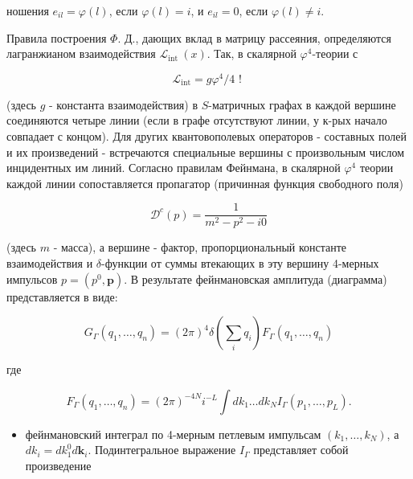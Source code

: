 \documentclass[10pt]{article}
\begin{document}
ношения $e_{i l}=\varphi(l)$, если $\varphi(l)=i$, и $e_{i l}=0$, если $\varphi(l) \neq i$.



Правила построения $\Phi$. Д., дающих вклад в матрицу рассеяния, определяются лагранжианом взаимодействия $\mathscr{L}_{\text {int }}(x)$. Так, в скалярной $\varphi^{4}$-теории с



\[

\mathscr{L}_{\mathrm{int}}=g \varphi^{4} / 4 \text { ! }

\]



(здесь $g$ - константа взаимодействия) в $S$-матричных графах в каждой вершине соединяются четыре линии (если в графе отсутствуют линии, у к-рых начало совпадает с концом). Для других квантовополевых операторов - составных полей и их произведений - встречаются специальные вершины с произвольным числом инцидентных им линий. Согласно правилам Фейнмана, в скалярной $\varphi^{4}$ теории каждой линии сопоставляется пропагатор (причинная функция свободного поля)



\[

\mathscr{D}^{c}(p)=\frac{1}{m^{2}-p^{2}-i 0}

\]



(здесь $m$ - масса), а вершине - фактор, пропорциональный константе взаимодействия и $\delta$-функции от суммы втекающих в эту вершину 4-мерных импульсов $p=\left(p^{0}, \boldsymbol{p}\right)$. В результате фейнмановская амплитуда (диаграмма) представляется в виде:



\[

G_{\Gamma}\left(q_{1}, \ldots, q_{n}\right)=(2 \pi)^{4} \delta\left(\sum_{i} q_{i}\right) F_{\Gamma}\left(q_{1}, \ldots, q_{n}\right)

\]



где



\[

F_{\Gamma}\left(q_{1}, \ldots, q_{n}\right)=(2 \pi)^{-4 N} i^{-L} \int d k_{1} \ldots d k_{N} I_{\Gamma}\left(p_{1}, \ldots, p_{L}\right) .

\]



\begin{itemize}

  \item фейнмановский интеграл по 4-мерным петлевым импульсам $\left(k_{1}, \ldots, k_{N}\right)$, а $d k_{i}=d k_{1}^{0} d \boldsymbol{k}_{i}$. Подинтегральное выражение $I_{\Gamma}$ представляет собой произведение

\end{itemize}
\end{document}
